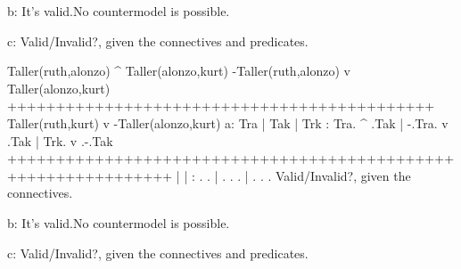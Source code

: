         b: It's valid.\OR No countermodel is possible.\OR
        \heightmodel
         
        \endheightmodel

        c: Valid/Invalid?, given the connectives and predicates.
        \endanswerlist

\argument
 Taller(ruth,alonzo) ^ Taller(alonzo,kurt)
 -Taller(ruth,alonzo) v Taller(alonzo,kurt)
++++++++++++++++++++++++++++++++++++++++++++
 Taller(ruth,kurt) v -Taller(alonzo,kurt) 
\endargument
        \answerlist
        a:
        \truthtable
         Tra | Tak | Trk : Tra. ^ .Tak | -.Tra. v .Tak | Trk. v .-.Tak
        +++++++++++++++++++++++++++++++++++++++++++++++++++++++++++++++
             |     |     :    .   .    |  .   .   .    |    .   . .  
        \endtruthtable
        Valid/Invalid?, given the connectives.

        b: It's valid.\OR No countermodel is possible.\OR
        \heightmodel
         
        \endheightmodel

        c: Valid/Invalid?, given the connectives and predicates.
        \endanswerlist

\endproblems
\bye
